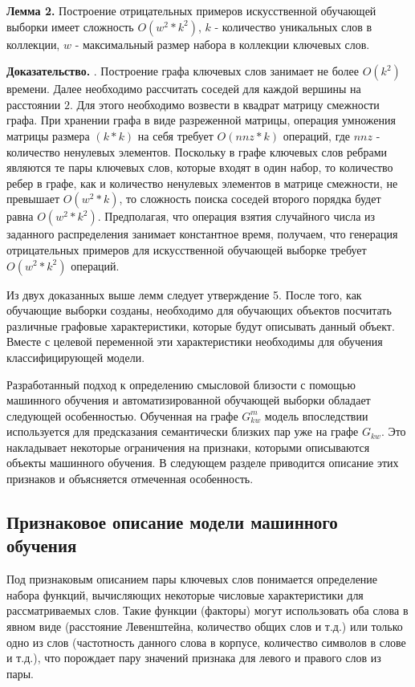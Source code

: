 \textbf{Лемма 2.} Построение отрицательных примеров искусственной обучающей выборки имеет сложность $O(w^2 * k^2)$, $k$ - количество уникальных слов в коллекции, $w$ - максимальный размер набора в коллекции ключевых слов.

\textbf{Доказательство.} 
. Построение графа ключевых слов занимает не более $O(k^2)$ времени. Далее необходимо рассчитать соседей для каждой вершины на расстоянии $2$. Для этого необходимо возвести в квадрат матрицу смежности графа. При хранении графа в виде разреженной матрицы, операция умножения матрицы размера $(k*k)$ на себя требует $O(nnz * k)$ операций, где $nnz$ - количество ненулевых элементов. Поскольку в графе ключевых слов ребрами являются те пары ключевых слов, которые входят в один набор, то количество ребер в графе, как и количество ненулевых элементов в матрице смежности, не превышает $O(w^2 * k)$, то сложность поиска соседей второго порядка будет равна $O(w^2 * k^2)$. Предполагая, что операция взятия случайного числа из заданного распределения занимает константное время, получаем, что генерация отрицательных примеров для искусственной обучающей выборке требует $O(w^2 * k^2)$ операций.

Из двух доказанных выше лемм следует утверждение 5. После того, как обучающие выборки созданы, необходимо для обучающих объектов посчитать различные графовые характеристики, которые будут описывать данный объект. Вместе с целевой переменной эти характеристики необходимы для обучения классифицирующей модели.

Разработанный подход к определению смысловой близости с помощью машинного обучения и автоматизированной обучающей выборки обладает следующей особенностью. Обученная на графе $G^m_{kw}$ модель впоследствии используется для предсказания семантически близких пар уже на графе $G_{kw}$. Это накладывает некоторые ограничения на признаки, которыми описываются объекты машинного обучения. В следующем разделе приводится описание этих признаков и объясняется отмеченная особенность.

\subsection{Признаковое описание модели машинного обучения} \label{sec:features}
Под признаковым описанием пары ключевых слов понимается определение набора функций, вычисляющих некоторые числовые характеристики для рассматриваемых слов. Такие функции (факторы) могут использовать оба слова в явном виде (расстояние Левенштейна, количество общих слов и т.д.) или только одно из слов (частотность данного слова в корпусе, количество символов в слове и т.д.), что порождает пару значений признака для левого и правого слов из пары.

